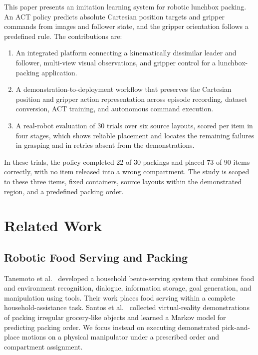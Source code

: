 \documentclass[conference]{IEEEtran}
\begin{document}
This paper presents an imitation learning system for robotic lunchbox
packing. An ACT policy predicts absolute Cartesian position targets and
gripper commands from images and follower state, and the gripper orientation
follows a predefined rule. The contributions are:
\begin{enumerate}
\item An integrated platform connecting a kinematically dissimilar leader
and follower, multi-view visual observations, and gripper control for a
lunchbox-packing application.
\item A demonstration-to-deployment workflow that preserves the Cartesian
position and gripper action representation across episode recording,
dataset conversion, ACT training, and autonomous command execution.
\item A real-robot evaluation of 30 trials over six source layouts, scored
per item in four stages, which shows reliable placement and locates the
remaining failures in grasping and in retries absent from the demonstrations.
\end{enumerate}
In these trials, the policy completed 22 of 30 packings and placed 73 of 90
items correctly, with no item released into a wrong compartment. The study is
scoped to these three items, fixed containers, source layouts within the
demonstrated region, and a predefined packing order.

\section{Related Work}
\label{sec:related}
\subsection{Robotic Food Serving and Packing}
Tanemoto et al.~\cite{tanemoto2022bento} developed a household bento-serving
system that combines food and environment recognition, dialogue, information
storage, goal generation, and manipulation using tools. Their work places
food serving within a complete household-assistance task. Santos et
al.~\cite{santos2024packing} collected virtual-reality demonstrations of
packing irregular grocery-like objects and learned a Markov model for
predicting packing order. We focus instead on executing demonstrated
pick-and-place motions on a physical manipulator under a prescribed order and
compartment assignment.
\end{document}
